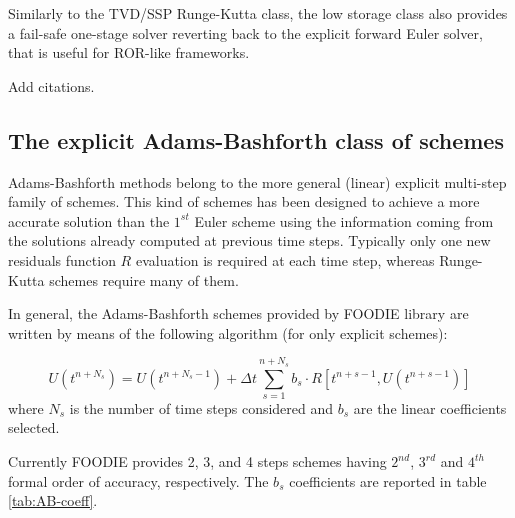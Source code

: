 Similarly to the TVD/SSP Runge-Kutta class, the low storage class also provides a fail-safe one-stage solver reverting back to the explicit forward Euler solver, that is useful for ROR-like frameworks.

{\color{red} Add citations.}

\subsection{The explicit Adams-Bashforth class of schemes}

Adams-Bashforth methods belong to the more general (linear) explicit multi-step family of schemes. This kind of schemes has been designed to achieve a more accurate solution than the $1^{st}$ Euler scheme using the information coming from the solutions already computed at previous time steps. Typically only one new residuals function $R$ evaluation is required at each time step, whereas Runge-Kutta schemes require many of them.

In general, the Adams-Bashforth schemes provided by FOODIE library are written by means of the following algorithm (for only explicit schemes):

\begin{equation}
U\left(t^{n+N_s}\right) = U\left(t^{n+N_s-1}\right) +\Delta t \sum_{s=1}^{n+N_s}{ b_s \cdot R\left[t^{n+s-1}, U\left(t^{n+s-1}\right)\right]}
\label{eq:AB}
\end{equation}
where $N_s$ is the number of time steps considered and $b_s$ are the linear coefficients selected.

Currently FOODIE provides 2, 3, and 4 steps schemes having $2^{nd}$, $3^{rd}$ and $4^{th}$ formal order of accuracy, respectively. The $b_s$ coefficients are reported in table \ref{tab:AB-coeff}.

\begin{table}[!ht]
  \centering
  \caption{Explicit Adams-Bashforth coefficients\label{tab:AB-coeff}}
\end{table}

